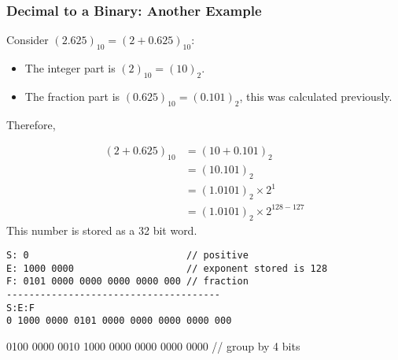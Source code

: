 \begin{frame}[fragile]\frametitle{Decimal to a Binary: Another Example}

Consider $(2.625)_{10}=(2+0.625)_{10}$:
\begin{itemize}
\item The integer part is $(2)_{10}=(10)_2$.
\item The fraction part is $(0.625)_{10}=(0.101)_2$, this was calculated previously.
\end{itemize}
Therefore,{\footnotesize
\begin{align*}
(2+0.625)_{10} &= (10+0.101)_2 \\
& = (10.101)_2 \\
& = (1.0101)_2 \times 2 ^1 \\
& = (1.0101)_2 \times 2 ^{128-127}
\end{align*}
This number is stored as a 32 bit word.
\begin{verbatim}
S: 0                            // positive 
E: 1000 0000                    // exponent stored is 128
F: 0101 0000 0000 0000 0000 000 // fraction
--------------------------------------
S:E:F
0 1000 0000 0101 0000 0000 0000 0000 000
\end{verbatim}
}
{\tiny{0100 0000 0010 1000 0000 0000 0000 0000 // group by 4 bits}}
\end{frame}

